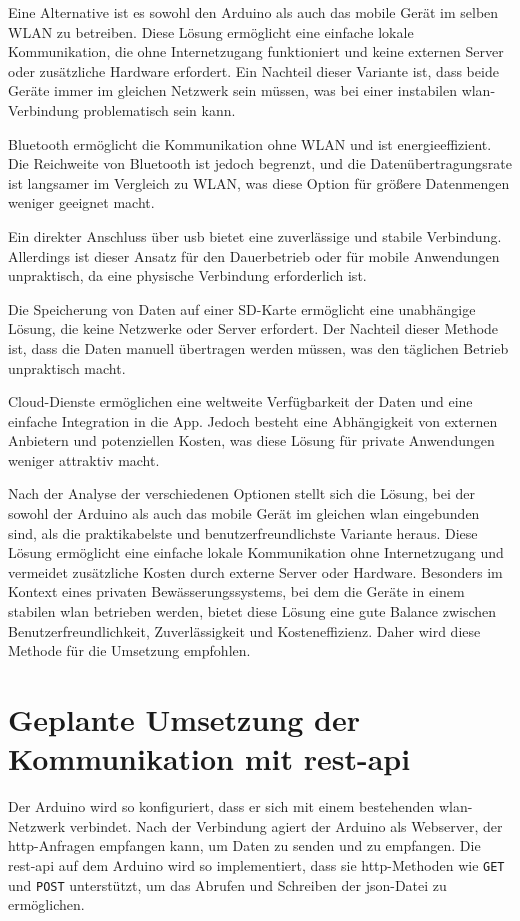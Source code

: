 Eine Alternative ist es sowohl den Arduino als auch das mobile Gerät im selben WLAN zu betreiben. Diese Lösung ermöglicht eine einfache lokale Kommunikation, die ohne Internetzugang funktioniert und keine externen Server oder zusätzliche Hardware erfordert. Ein Nachteil dieser Variante ist, dass beide Geräte immer im gleichen Netzwerk sein müssen, was bei einer instabilen \ac{wlan}-Verbindung problematisch sein kann.

Bluetooth ermöglicht die Kommunikation ohne WLAN und ist energieeffizient. Die Reichweite von Bluetooth ist jedoch begrenzt, und die Datenübertragungsrate ist langsamer im Vergleich zu WLAN, was diese Option für größere Datenmengen weniger geeignet macht.

Ein direkter Anschluss über \ac{usb} bietet eine zuverlässige und stabile Verbindung. Allerdings ist dieser Ansatz für den Dauerbetrieb oder für mobile Anwendungen unpraktisch, da eine physische Verbindung erforderlich ist.

Die Speicherung von Daten auf einer SD-Karte ermöglicht eine unabhängige Lösung, die keine Netzwerke oder Server erfordert. Der Nachteil dieser Methode ist, dass die Daten manuell übertragen werden müssen, was den täglichen Betrieb unpraktisch macht.

Cloud-Dienste ermöglichen eine weltweite Verfügbarkeit der Daten und eine einfache Integration in die App. Jedoch besteht eine Abhängigkeit von externen Anbietern und potenziellen Kosten, was diese Lösung für private Anwendungen weniger attraktiv macht.

Nach der Analyse der verschiedenen Optionen stellt sich die Lösung, bei der sowohl der Arduino als auch das mobile Gerät im gleichen \ac{wlan} eingebunden sind, als die praktikabelste und benutzerfreundlichste Variante heraus. Diese Lösung ermöglicht eine einfache lokale Kommunikation ohne Internetzugang und vermeidet zusätzliche Kosten durch externe Server oder Hardware. Besonders im Kontext eines privaten Bewässerungssystems, bei dem die Geräte in einem stabilen \ac{wlan} betrieben werden, bietet diese Lösung eine gute Balance zwischen Benutzerfreundlichkeit, Zuverlässigkeit und Kosteneffizienz. Daher wird diese Methode für die Umsetzung empfohlen.


\section{Geplante Umsetzung der Kommunikation mit \ac{rest}-\ac{api}}

Der Arduino wird so konfiguriert, dass er sich mit einem bestehenden \ac{wlan}-Netzwerk verbindet. Nach der Verbindung agiert der Arduino als Webserver, der \ac{http}-Anfragen empfangen kann, um Daten zu senden und zu empfangen. Die \ac{rest}-\ac{api} auf dem Arduino wird so implementiert, dass sie \ac{http}-Methoden wie \texttt{GET} und \texttt{POST} unterstützt, um das Abrufen und Schreiben der \ac{json}-Datei zu ermöglichen.

